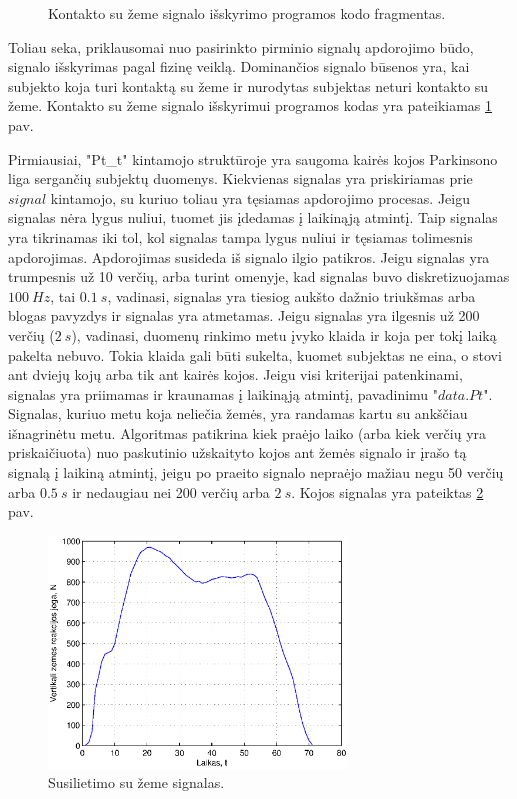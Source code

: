 \documentclass[10pt,onecolumn,draftcls]{IEEEtran}
\begin{document}
\begin{figure}[t]
  \centering
  
  \caption{Kontakto su žeme signalo išskyrimo programos kodo fragmentas.}
  \label{code:signal_extraction}
\end{figure}

Toliau seka, priklausomai nuo pasirinkto pirminio signalų apdorojimo
būdo, signalo išskyrimas pagal fizinę veiklą. Dominančios signalo
būsenos yra, kai subjekto koja turi kontaktą su žeme ir nurodytas
subjektas neturi kontakto su žeme. Kontakto su žeme signalo išskyrimui
programos kodas yra pateikiamas \ref{code:signal_extraction} pav.

Pirmiausiai, "Pt\_t" kintamojo struktūroje yra saugoma kairės kojos
Parkinsono liga sergančių subjektų duomenys. Kiekvienas signalas yra
priskiriamas prie $signal$ kintamojo, su kuriuo toliau yra tęsiamas
apdorojimo procesas. Jeigu signalas nėra lygus nuliui, tuomet jis
įdedamas į laikinąją atmintį. Taip signalas yra tikrinamas iki tol,
kol signalas tampa lygus nuliui ir tęsiamas tolimesnis
apdorojimas. Apdorojimas susideda iš signalo ilgio patikros. Jeigu
signalas yra trumpesnis už 10 verčių, arba turint omenyje, kad
signalas buvo diskretizuojamas $100~Hz$, tai $0.1~s$, vadinasi,
signalas yra tiesiog aukšto dažnio triukšmas arba blogas pavyzdys ir
signalas yra atmetamas. Jeigu signalas yra ilgesnis už 200 verčių
($2~s$), vadinasi, duomenų rinkimo metu įvyko klaida ir koja per tokį
laiką pakelta nebuvo. Tokia klaida gali būti sukelta, kuomet subjektas
ne eina, o stovi ant dviejų kojų arba tik ant kairės kojos. Jeigu visi
kriterijai patenkinami, signalas yra priimamas ir kraunamas į
laikinąją atmintį, pavadinimu "$data.Pt$". Signalas, kuriuo metu koja
neliečia žemės, yra randamas kartu su ankščiau išnagrinėtu
metu. Algoritmas patikrina kiek praėjo laiko (arba kiek verčių yra
priskaičiuota) nuo paskutinio užskaityto kojos ant žemės signalo ir
įrašo tą signalą į laikiną atmintį, jeigu po praeito signalo nepraėjo
mažiau negu 50 verčių arba $0.5~s$ ir nedaugiau nei 200 verčių arba
$2~s$. Kojos signalas yra pateiktas \ref{fig:stance_phase} pav.

\begin{figure}[t]
  \centering
  \includegraphics[width=300px]{figures/09_sample_stance_phase.eps}
  \caption{Susilietimo su žeme signalas.}
  \label{fig:stance_phase}
\end{figure}
\end{document}
